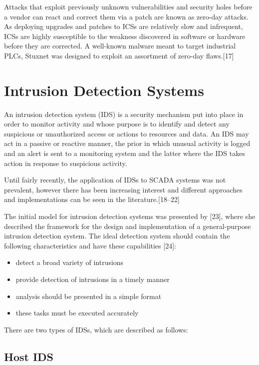 \documentclass[11pt,]{article}
\begin{document}
Attacks that exploit previously unknown vulnerabilities and security
holes before a vendor can react and correct them via a patch are known
as zero-day attacks. As deploying upgrades and patches to ICSs are
relatively slow and infrequent, ICSs are highly susceptible to the
weakness discovered in software or hardware before they are corrected. A
well-known malware meant to target industrial PLCs, Stuxnet was designed
to exploit an assortment of zero-day flaws.{[}17{]}

\newpage

\section{Intrusion Detection Systems}\label{intrusion-detection-systems}

An intrusion detection system (IDS) is a security mechanism put into
place in order to monitor activity and whose purpose is to identify and
detect any suspicious or unauthorized access or actions to resources and
data. An IDS may act in a passive or reactive manner, the prior in which
unusual activity is logged and an alert is sent to a monitoring system
and the latter where the IDS takes action in response to suspicious
activity.

Until fairly recently, the application of IDSs to SCADA systems was not
prevalent, however there has been increasing interest and different
approaches and implementations can be seen in the
literature.{[}18--22{]}

The initial model for intrusion detection systems was presented by
{[}23{]}, where she described the framework for the design and
implementation of a general-purpose intrusion detection system. The
ideal detection system should contain the following characteristics and
have these capabilities {[}24{]}:

\begin{itemize}
\itemsep1pt\parskip0pt
\item
  detect a broad variety of intrusions
\item
  provide detection of intrusions in a timely manner
\item
  analysis should be presented in a simple format
\item
  these tasks must be executed accurately
\end{itemize}

There are two types of IDSs, which are described as follows:

\subsection{Host IDS}\label{host-ids}
\end{document}
